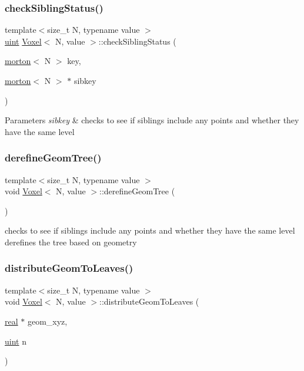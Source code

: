 \subsubsection{\texorpdfstring{check\+Sibling\+Status()}{checkSiblingStatus()}}
{\footnotesize\ttfamily template$<$size\+\_\+t N, typename value $>$ \\
\mbox{\hyperlink{definitions_8h_a69aa29b598b851b0640aa225a9e5d61d}{uint}} \mbox{\hyperlink{classVoxel}{Voxel}}$<$ N, value $>$\+::check\+Sibling\+Status (\begin{DoxyParamCaption}\item[{\mbox{\hyperlink{definitions_8h_af8682350bd8bb38ee9023f7a0a310add}{morton}}$<$ N $>$}]{key,  }\item[{\mbox{\hyperlink{definitions_8h_af8682350bd8bb38ee9023f7a0a310add}{morton}}$<$ N $>$ $\ast$}]{sibkey }\end{DoxyParamCaption})}


\begin{DoxyParams}{Parameters}
{\em sibkey} & checks to see if siblings include any points and whether they have the same level \\
\hline
\end{DoxyParams}
\mbox{\label{classVoxel_ad34c50e8ed627e20dba6188a1c074854}} 
\subsubsection{\texorpdfstring{derefine\+Geom\+Tree()}{derefineGeomTree()}}
{\footnotesize\ttfamily template$<$size\+\_\+t N, typename value $>$ \\
void \mbox{\hyperlink{classVoxel}{Voxel}}$<$ N, value $>$\+::derefine\+Geom\+Tree (\begin{DoxyParamCaption}{ }\end{DoxyParamCaption})}

checks to see if siblings include any points and whether they have the same level derefines the tree based on geometry \mbox{\label{classVoxel_a97154e50e16297f2f9e81cac91271aee}} 
\subsubsection{\texorpdfstring{distribute\+Geom\+To\+Leaves()}{distributeGeomToLeaves()}}
{\footnotesize\ttfamily template$<$size\+\_\+t N, typename value $>$ \\
void \mbox{\hyperlink{classVoxel}{Voxel}}$<$ N, value $>$\+::distribute\+Geom\+To\+Leaves (\begin{DoxyParamCaption}\item[{\mbox{\hyperlink{definitions_8h_aedc0ad84d1e764530814f57ad931d02a}{real}} $\ast$}]{geom\+\_\+xyz,  }\item[{\mbox{\hyperlink{definitions_8h_a69aa29b598b851b0640aa225a9e5d61d}{uint}}}]{n }\end{DoxyParamCaption})}

